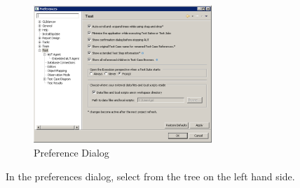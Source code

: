 \label{gdprefs}

\begin{figure}[h]
\begin{center}
\includegraphics[width=0.60\textwidth]{Tasks/Preferences/PS/gdprefs}
\caption{\app{} Preference Dialog}
\label{gdprefs}
\end{center}
\end{figure}

 In the preferences dialog, select  from the tree on the left hand side.

